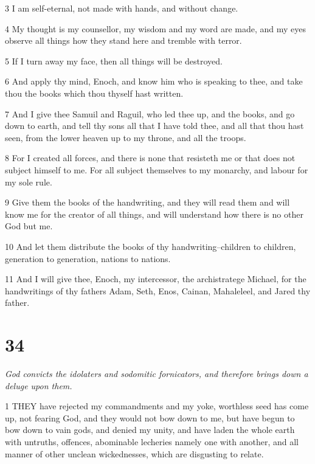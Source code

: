 \par 3 I am self-eternal, not made with hands, and without change.

\par 4 My thought is my counsellor, my wisdom and my word are made, and my eyes observe all things how they stand here and tremble with terror.

\par 5 If I turn away my face, then all things will be destroyed.

\par 6 And apply thy mind, Enoch, and know him who is speaking to thee, and take thou the books which thou thyself hast written.

\par 7 And I give thee Samuil and Raguil, who led thee up, and the books, and go down to earth, and tell thy sons all that I have told thee, and all that thou hast seen, from the lower heaven up to my throne, and all the troops.

\par 8 For I created all forces, and there is none that resisteth me or that does not subject himself to me. For all subject themselves to my monarchy, and labour for my sole rule.

\par 9 Give them the books of the handwriting, and they will read them and will know me for the creator of all things, and will understand how there is no other God but me.

\par 10 And let them distribute the books of thy handwriting--children to children, generation to generation, nations to nations.

\par 11 And I will give thee, Enoch, my intercessor, the archistratege Michael, for the handwritings of thy fathers Adam, Seth, Enos, Cainan, Mahaleleel, and Jared thy father.

\chapter{34}

\par \textit{God convicts the idolaters and sodomitic fornicators, and therefore brings down a deluge upon them.}

\par 1 THEY have rejected my commandments and my yoke, worthless seed has come up, not fearing God, and they would not bow down to me, but have begun to bow down to vain gods, and denied my unity, and have laden the whole earth with untruths, offences, abominable lecheries namely one with another, and all manner of other unclean wickednesses, which are disgusting to relate.

